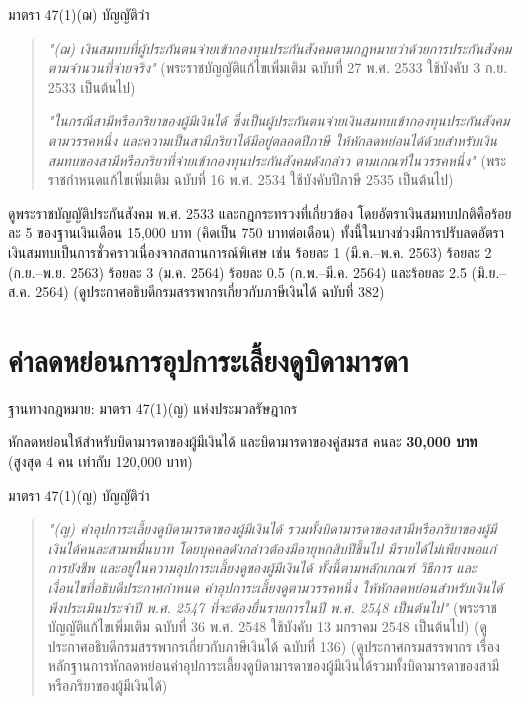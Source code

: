 \documentclass[12pt,a4paper]{article}
\newcommand{\hilight}[1]{\textbf{#1}}
\begin{document}
มาตรา 47(1)(ฌ) บัญญัติว่า

\begin{quote}
\textit{"(ฌ) เงินสมทบที่ผู้ประกันตนจ่ายเข้ากองทุนประกันสังคมตามกฎหมายว่าด้วยการประกันสังคมตามจำนวนที่จ่ายจริง"} (พระราชบัญญัติแก้ไขเพิ่มเติม ฉบับที่ 27 พ.ศ. 2533 ใช้บังคับ 3 ก.ย. 2533 เป็นต้นไป)

\textit{"ในกรณีสามีหรือภริยาของผู้มีเงินได้ ซึ่งเป็นผู้ประกันตนจ่ายเงินสมทบเข้ากองทุนประกันสังคมตามวรรคหนึ่ง และความเป็นสามีภริยาได้มีอยู่ตลอดปีภาษี ให้หักลดหย่อนได้ด้วยสำหรับเงินสมทบของสามีหรือภริยาที่จ่ายเข้ากองทุนประกันสังคมดังกล่าว ตามเกณฑ์ในวรรคหนึ่ง"} (พระราชกำหนดแก้ไขเพิ่มเติม ฉบับที่ 16 พ.ศ. 2534 ใช้บังคับปีภาษี 2535 เป็นต้นไป)
\end{quote}

ดูพระราชบัญญัติประกันสังคม พ.ศ. 2533 และกฎกระทรวงที่เกี่ยวข้อง โดยอัตราเงินสมทบปกติคือร้อยละ 5 ของฐานเงินเดือน 15,000 บาท (คิดเป็น 750 บาทต่อเดือน) ทั้งนี้ในบางช่วงมีการปรับลดอัตราเงินสมทบเป็นการชั่วคราวเนื่องจากสถานการณ์พิเศษ เช่น ร้อยละ 1 (มี.ค.--พ.ค. 2563) ร้อยละ 2 (ก.ย.--พ.ย. 2563) ร้อยละ 3 (ม.ค. 2564) ร้อยละ 0.5 (ก.พ.--มี.ค. 2564) และร้อยละ 2.5 (มิ.ย.--ส.ค. 2564) (ดูประกาศอธิบดีกรมสรรพากรเกี่ยวกับภาษีเงินได้ ฉบับที่ 382)

\newpage
\section{ค่าลดหย่อนการอุปการะเลี้ยงดูบิดามารดา}

ฐานทางกฎหมาย: มาตรา 47(1)(ญ) แห่งประมวลรัษฎากร

หักลดหย่อนให้สำหรับบิดามารดาของผู้มีเงินได้ และบิดามารดาของคู่สมรส คนละ \hilight{30,000 บาท} (สูงสุด 4 คน เท่ากับ 120,000 บาท)

มาตรา 47(1)(ญ) บัญญัติว่า

\begin{quote}
\textit{"(ญ) ค่าอุปการะเลี้ยงดูบิดามารดาของผู้มีเงินได้ รวมทั้งบิดามารดาของสามีหรือภริยาของผู้มีเงินได้คนละสามหมื่นบาท โดยบุคคลดังกล่าวต้องมีอายุหกสิบปีขึ้นไป มีรายได้ไม่เพียงพอแก่การยังชีพ และอยู่ในความอุปการะเลี้ยงดูของผู้มีเงินได้ ทั้งนี้ตามหลักเกณฑ์ วิธีการ และเงื่อนไขที่อธิบดีประกาศกำหนด ค่าอุปการะเลี้ยงดูตามวรรคหนึ่ง ให้หักลดหย่อนสำหรับเงินได้พึงประเมินประจำปี พ.ศ. 2547 ที่จะต้องยื่นรายการในปี พ.ศ. 2548 เป็นต้นไป"} (พระราชบัญญัติแก้ไขเพิ่มเติม ฉบับที่ 36 พ.ศ. 2548 ใช้บังคับ 13 มกราคม 2548 เป็นต้นไป) (ดูประกาศอธิบดีกรมสรรพากรเกี่ยวกับภาษีเงินได้ ฉบับที่ 136) (ดูประกาศกรมสรรพากร เรื่อง หลักฐานการหักลดหย่อนค่าอุปการะเลี้ยงดูบิดามารดาของผู้มีเงินได้รวมทั้งบิดามารดาของสามีหรือภริยาของผู้มีเงินได้)
\end{quote}
\end{document}
